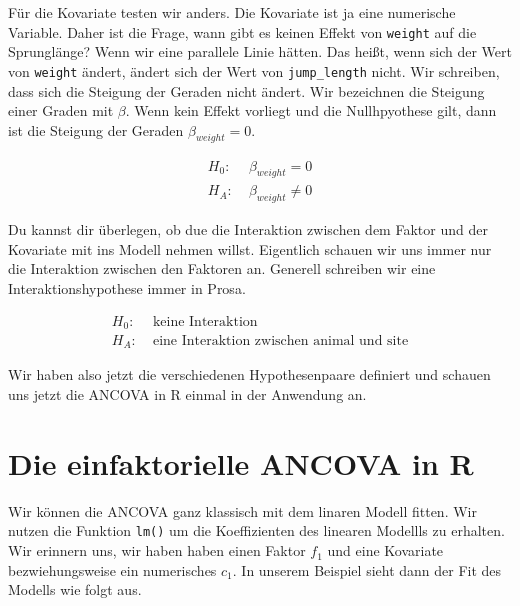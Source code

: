 \documentclass[
  letterpaper,
]{scrbook}
\begin{document}
{}

Für die Kovariate testen wir anders. Die Kovariate ist ja eine
numerische Variable. Daher ist die Frage, wann gibt es keinen Effekt von
\texttt{weight} auf die Sprunglänge? Wenn wir eine parallele Linie
hätten. Das heißt, wenn sich der Wert von \texttt{weight} ändert, ändert
sich der Wert von \texttt{jump\_length} nicht. Wir schreiben, dass sich
die Steigung der Geraden nicht ändert. Wir bezeichnen die Steigung einer
Graden mit \(\beta\). Wenn kein Effekt vorliegt und die Nullhpyothese
gilt, dann ist die Steigung der Geraden \(\beta_{weight} = 0\).

\[
\begin{align*}
H_0: &\; \beta_{weight} = 0\\
H_A: &\; \beta_{weight} \neq 0
\end{align*}
\]

Du kannst dir überlegen, ob due die Interaktion zwischen dem Faktor und
der Kovariate mit ins Modell nehmen willst. Eigentlich schauen wir uns
immer nur die Interaktion zwischen den Faktoren an. Generell schreiben
wir eine Interaktionshypothese immer in Prosa.

\[
\begin{align*}
H_0: &\; \mbox{keine Interaktion}\\
H_A: &\; \mbox{eine Interaktion zwischen animal und site}
\end{align*}
\]

Wir haben also jetzt die verschiedenen Hypothesenpaare definiert und
schauen uns jetzt die ANCOVA in R einmal in der Anwendung an.

\hypertarget{die-einfaktorielle-ancova-in-r}{%
\section{Die einfaktorielle ANCOVA in
R}\label{die-einfaktorielle-ancova-in-r}}

{}

Wir können die ANCOVA ganz klassisch mit dem linaren Modell fitten. Wir
nutzen die Funktion \texttt{lm()} um die Koeffizienten des linearen
Modellls zu erhalten. Wir erinnern uns, wir haben haben einen Faktor
\(f_1\) und eine Kovariate bezwiehungsweise ein numerisches \(c_1\). In
unserem Beispiel sieht dann der Fit des Modells wie folgt aus.
\end{document}
